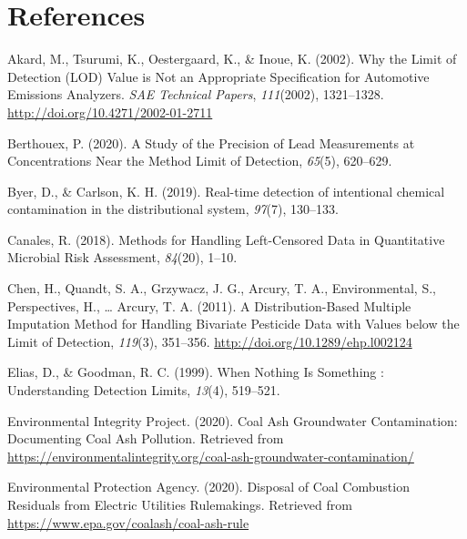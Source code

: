 \documentclass[12pt, twoside]{amherstthesis}
\newlength{\cslhangindent}
\newenvironment{cslreferences}%
  {\setlength{\parindent}{0pt}%
  \everypar{\setlength{\hangindent}{\cslhangindent}}\ignorespaces}%
  {\par}
\begin{document}
\backmatter

\hypertarget{references}{%
\chapter*{References}\label{references}}

\noindent

\setlength{\parindent}{-0.20in}
\setlength{\leftskip}{0.20in}
\setlength{\parskip}{8pt}

\hypertarget{refs}{}
\begin{cslreferences}
\leavevmode\hypertarget{ref-Akard2002}{}%
Akard, M., Tsurumi, K., Oestergaard, K., \& Inoue, K. (2002). Why the Limit of Detection (LOD) Value is Not an Appropriate Specification for Automotive Emissions Analyzers. \emph{SAE Technical Papers}, \emph{111}(2002), 1321--1328. \url{http://doi.org/10.4271/2002-01-2711}

\leavevmode\hypertarget{ref-Berthouex2020}{}%
Berthouex, P. (2020). A Study of the Precision of Lead Measurements at Concentrations Near the Method Limit of Detection, \emph{65}(5), 620--629.

\leavevmode\hypertarget{ref-Byer2019}{}%
Byer, D., \& Carlson, K. H. (2019). Real-time detection of intentional chemical contamination in the distributional system, \emph{97}(7), 130--133.

\leavevmode\hypertarget{ref-Canales2018}{}%
Canales, R. (2018). Methods for Handling Left-Censored Data in Quantitative Microbial Risk Assessment, \emph{84}(20), 1--10.

\leavevmode\hypertarget{ref-Chen2011}{}%
Chen, H., Quandt, S. A., Grzywacz, J. G., Arcury, T. A., Environmental, S., Perspectives, H., \ldots{} Arcury, T. A. (2011). A Distribution-Based Multiple Imputation Method for Handling Bivariate Pesticide Data with Values below the Limit of Detection, \emph{119}(3), 351--356. \url{http://doi.org/10.1289/ehp.l002124}

\leavevmode\hypertarget{ref-Elias1999}{}%
Elias, D., \& Goodman, R. C. (1999). When Nothing Is Something : Understanding Detection Limits, \emph{13}(4), 519--521.

\leavevmode\hypertarget{ref-EIP2020}{}%
Environmental Integrity Project. (2020). Coal Ash Groundwater Contamination: Documenting Coal Ash Pollution. Retrieved from \url{https://environmentalintegrity.org/coal-ash-groundwater-contamination/}

\leavevmode\hypertarget{ref-Car2020}{}%
Environmental Protection Agency. (2020). Disposal of Coal Combustion Residuals from Electric Utilities Rulemakings. Retrieved from \url{https://www.epa.gov/coalash/coal-ash-rule}


\end{cslreferences}
\end{document}
